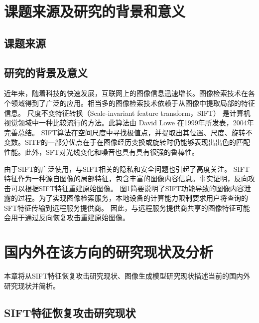\section{课题来源及研究的背景和意义}
\subsection{课题来源}
\subsection{研究的背景及意义}
近年来，随着科技的快速发展，互联网上的图像信息迅速增长。图像检索技术在各个领域得到了广泛的应用。相当多的图像检索技术依赖于从图像中提取局部的特征信息。
尺度不变特征转换（Scale-invariant feature transform，SIFT）
\cite{loweDistinctiveImageFeatures2004}
是计算机视觉领域中一种比较流行的方法。此算法由 David Lowe 在1999年所发表，2004年完善总结。
SIFT算法在空间尺度中寻找极值点，并提取出其位置、尺度、旋转不变数。SITF的一部分优点在于在图像经历变换或旋转时仍能够表现出出色的匹配性能。此外，SFT对光线变化和噪音也具有具有很强的鲁棒性。
\par
由于SIFT的广泛使用，与SIFT相关的隐私和安全问题也引起了高度关注。
SIFT特征作为一种源自图像的局部特征，包含丰富的图像内容信息。事实证明，反向攻击可以根据SIFT特征重建原始图像。
图1简要说明了SIFT功能导致的图像内容泄露的过程。为了实现图像检索服务，本地设备的计算能力限制要求用户将查询的SFT特征传输到远程服务提供商。
因此，与远程服务提供商共享的图像特征可能会用于通过反向恢复攻击重建原始图像。

\section{国内外在该方向的研究现状及分析}
本章将从SIFT特征恢复攻击研究现状、图像生成模型研究现状描述当前的国内外研究现状并简析。
\subsection{SIFT特征恢复攻击研究现状}
